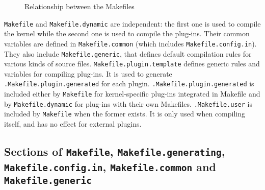 \begin{figure}[htbp]
\caption{Relationship between the Makefiles}\label{fig:makefiles}
\end{figure}
\texttt{Makefile} and \texttt{Makefile.dynamic} are independent: the first one
is used to compile the \framac kernel while the second one is used to compile
the \framac plug-ins. Their common variables are defined in
\texttt{Makefile.common} (which includes
\texttt{Makefile.config.in}). They also include \texttt{Makefile.generic},
that defines default compilation rules for various kinds of source files.
\texttt{Makefile.plugin.template} defines generic rules
and variables for compiling plug-ins. It is used to generate
\texttt{.Makefile.plugin.generated} for each plugin.
\texttt{.Makefile.plugin.generated} is included either
by \texttt{Makefile} for
kernel-specific plug-ins integrated in \framac Makefile and by
\texttt{Makefile.dynamic} for plug-ins with their own Makefiles.
\texttt{.Makefile.user} is included by
\texttt{Makefile} when the former exists. It is only used when compiling
\framac itself, and has no effect for external plugins.

\subsection{Sections of \texttt{Makefile},
  \texttt{Makefile.generating},
  \texttt{Makefile.config.in}, 
  \texttt{Makefile.common} 
  and \texttt{Makefile.generic}}
\label{make:sections}

